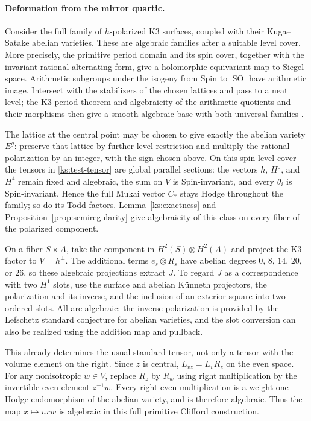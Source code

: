 \documentclass[11pt]{article}
\numberwithin{equation}{section}
\theoremstyle{definition}
\theoremstyle{remark}
\begin{document}
\paragraph{Deformation from the mirror quartic.}
Consider the full family of $h$-polarized K3 surfaces, coupled
with their Kuga--Satake abelian varieties.  These are algebraic families
after a suitable level cover.  More precisely, the primitive
period domain and its spin cover, together with the invariant
rational alternating form, give a holomorphic equivariant
map to Siegel space.  Arithmetic subgroups under the
isogeny from Spin to $\operatorname{SO}$ have arithmetic image.  Intersect
with the stabilizers of the chosen lattices and pass to a
neat level; the K3 period theorem and algebraicity of the
arithmetic quotients and their morphisms then give a smooth
algebraic base with both universal families
\cite{DeligneK3,BailyBorel,BorelAlgebraicity}.

The lattice at the central point may be chosen to give
exactly the abelian variety $E^g$: preserve that lattice
by further level restriction and multiply the rational
polarization by an integer, with the sign chosen above.
On this spin level cover the tensors in
\eqref{ks:test-tensor} are global parallel sections:
the vectors $h$, $H^0$, and $H^4$ remain fixed and algebraic, the
sum on $V$ is Spin-invariant, and every $\theta_i$ is
Spin-invariant.  Hence the full Mukai vector $C_*$ stays
Hodge throughout the family; so do its Todd factors.
Lemma~\ref{ks:exactness} and
Proposition~\ref{prop:semiregularity} give algebraicity
of this class on every fiber of the polarized component.

On a fiber $S\times A$, take the component in $H^2(S)\otimes H^2(A)$
and project the K3 factor to
$V=h^\perp$.  The additional terms $e_s\otimes R_s$ have
abelian degrees $0$, $8$, $14$, $20$, or $26$, so these
algebraic projections extract $J$.  To regard $J$ as a correspondence
with two $H^1$ slots, use the surface and abelian
K\"unneth projectors, the polarization and its inverse,
and the inclusion of an exterior square into two ordered
slots.  All are algebraic: the inverse polarization is
provided by the Lefschetz standard conjecture for abelian
varieties, and the slot conversion can also be realized
using the addition map and pullback.

This already determines the usual standard tensor, not
only a tensor with the volume element on the right.
Since $z$ is central, $L_{vz}=L_vR_z$ on the even space.
For any nonisotropic $w\in V$, replace $R_z$ by $R_w$
using right multiplication by the invertible even
element $z^{-1}w$.  Every right even multiplication is
a weight-one Hodge endomorphism of the abelian variety,
and is therefore algebraic.  Thus the map
$x\mapsto vxw$ is algebraic in this full primitive
Clifford construction.
\end{document}
